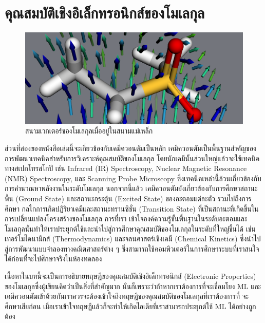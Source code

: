 

\chapter{คุณสมบัติเชิงอิเล็กทรอนิกส์ของโมเลกุล}
\label{ch:el_prop}

\begin{figure}[htbp]
    \centering
    \includegraphics[width=0.9\linewidth]{fig/mol_properties.png}
    \caption{สนามเวกเตอร์ของโมเลกุลเมื่ออยู่ในสนามแม่เหล็ก}
    \label{fig:mol_prop}
\end{figure}

ส่วนที่สองของหนังสือเล่มนี้จะเกี่ยวข้องกับเคมีควอนตัมเป็นหลัก เคมีควอนตัมเป็นพื้นฐานสำคัญของการพัฒนาเทคนิคสำหรับการวิเคราะห์คุณสมบัติของโมเลกุล
โดยนักเคมีนั้นส่วนใหญ่แล้วจะใช้เทคนิคทางสเปกโทรสโกปี เช่น Infrared (IR) Spectroscopy, Nuclear Magnetic Resonance (NMR) 
Spectroscopy, และ Scanning Probe Microscopy ซึ่งเทคนิคเหล่านี้ล้วนเกี่ยวข้องกับการคำนวณหาพลังงานในระดับโมเลกุล นอกจากนี้แล้ว%
เคมีควอนตัมยังเกี่ยวข้องกับการศึกษาสถานะพื้น (Ground State) และสถานะกระตุ้น (Excited State) ของอะตอมแต่ละตัว รวมไปถึงการศึกษา%
กลไกการเกิดปฏิริยาเคมีและสถานะทรานซิชั่น (Transition State) ที่เป็นสถานะที่เกิดขึ้นในการเปลี่ยนแปลงโครงสร้างของโมเลกุล การที่เรา%
เข้าใจองค์ความรู้ขั้นพื้นฐานในระดับอะตอมและโมเลกุลนั้นทำให้เราประยุกต์ใช้และนำไปสู่การศึกษาคุณสมบัติของโมเลกุลในระดับที่ใหญ่ขึ้นได้ เช่น 
เทอร์โมไดนามิกส์ (Thermodynamics) และจลนศาสตร์เชิงเคมี (Chemical Kinetics) ซึ่งนำไปสู่การพัฒนาแบบจำลองทางคณิตศาสตร์ต่าง ๆ 
ซึ่งสามารถใช้คอมพิวเตอร์ในการศึกษาระบบที่เราสนใจได้ก่อนที่จะไปศึกษาจริงในห้องทดลอง

เนื้อหาในบทนี้จะเป็นการอธิบายทฤษฎีของคุณสมบัติเชิงอิเล็กทรอนิกส์ (Electronic Properties) ของโมเลกุลซึ่งผู้เขียนคิดว่าเป็นสิ่งที่สำคัญมาก 
นั่นก็เพราะว่าถ้าหากเราต้องการที่จะเชื่อมโยง ML และเคมีควอนตัมเข้าด้วยกันเราควรจะต้องเข้าใจถึงทฤษฎีของคุณสมบัติของโมเลกุลที่เราต้องการที่%
จะศึกษาเสียก่อน เมื่อเราเข้าใจทฤษฎีแล้วก็จะทำให้เกิดไอเดียที่เราสามารถประยุกต์ใช้ ML ได้อย่างถูกต้อง

